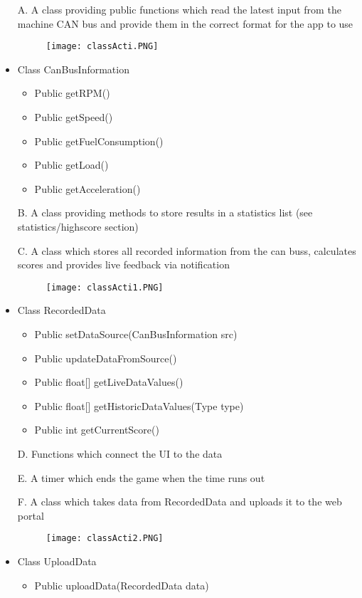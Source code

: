 \documentclass{article}
\begin{document}
\begin{itemize}
\item[A.] A class providing public functions which read the latest input from the machine CAN bus and provide them in the correct format for the app to use
\begin{figure}[h!]
\texttt{[image: classActi.PNG]}
\end{figure}
\item Class CanBusInformation
\begin{itemize}
\item Public getRPM()
\item Public getSpeed()
\item Public getFuelConsumption()
\item Public getLoad()
\item Public getAcceleration()
\end{itemize}
\item[B.] A class providing methods to store results in a statistics list (see statistics/highscore section)
\item[C.] A class which stores all recorded information from the can buss, calculates scores and provides live feedback via notification
\begin{figure}[h!]
\texttt{[image: classActi1.PNG]}
\end{figure}
\item Class RecordedData
\begin{itemize}
\item Public setDataSource(CanBusInformation src)
\item Public updateDataFromSource()
\item Public float[] getLiveDataValues()
\item Public float[] getHistoricDataValues(Type type)
\item Public int getCurrentScore()
\end{itemize}
\item[D.] Functions which connect the UI to the data
\item[E.] A timer which ends the game when the time runs out
\item[F.] A class which takes data from RecordedData and uploads it to the web portal
\begin{figure}[h!]
\texttt{[image: classActi2.PNG]}
\end{figure}
\item Class UploadData
\begin{itemize}
\item Public uploadData(RecordedData data)
\end{itemize}
\end{itemize}
\end{document}
